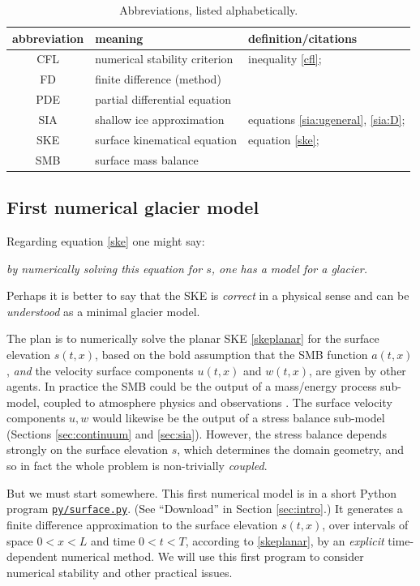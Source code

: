 \documentclass[letterpaper,final,12pt,reqno]{amsart}
\begin{document}
\begin{table}[t]
\caption{Abbreviations, listed alphabetically.}
\begin{tabular}{cll}
abbreviation & meaning & definition/citations \\ \hline
CFL & numerical stability criterion & inequality \eqref{cfl}; \cite{CFL1928,LeVeque2007,MortonMayers2005} \\
FD  & finite difference (method) & \cite{LeVeque2007,MortonMayers2005} \\
PDE & partial differential equation & \\
SIA & shallow ice approximation & equations \eqref{sia:ugeneral}, \eqref{sia:D}; \cite{GreveBlatter2009} \\
SKE & surface kinematical equation & equation \eqref{ske}; \cite{GreveBlatter2009} \\
SMB & surface mass balance & \cite{Cogleyetal2011}
\end{tabular}
\label{tab:abbrev}
\end{table}

\subsection*{First numerical glacier model}  Regarding equation \eqref{ske} one might say:
\begin{center}
\emph{by numerically solving this equation for $s$, one has a model for a glacier.}
\end{center}
Perhaps it is better to say that the SKE is \emph{correct} in a physical sense and can be \emph{understood} as a minimal glacier model.

The plan is to numerically solve the planar SKE \eqref{skeplanar} for the surface elevation $s(t,x)$, based on the bold assumption that the SMB function $a(t,x)$, \emph{and} the velocity surface components $u(t,x)$ and $w(t,x)$, are given by other agents.  In practice the SMB could be the output of a mass/energy process sub-model, coupled to atmosphere physics and observations \cite{vanderVeen2013}.  The surface velocity components $u,w$ would likewise be the output of a stress balance sub-model (Sections \ref{sec:continuum} and \ref{sec:sia}).  However, the stress balance depends strongly on the surface elevation $s$, which determines the domain geometry, and so in fact the whole problem is non-trivially \emph{coupled}.

But we must start somewhere.  This first numerical model is in a short Python program \href{https://github.com/bueler/mccarthy/blob/master/py/surface.py}{\texttt{py/surface.py}}.  (See ``Download'' in Section \ref{sec:intro}.)  It generates a finite difference approximation to the surface elevation $s(t,x)$, over intervals of space $0<x<L$ and time $0<t<T$, according to \eqref{skeplanar}, by an \emph{explicit} time-dependent numerical method.  We will use this first program to consider numerical stability and other practical issues.
\end{document}
